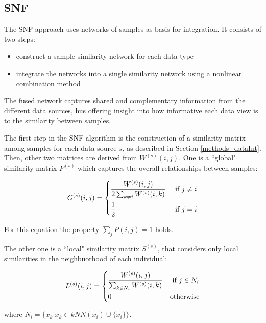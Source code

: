 \subsection{SNF} \label{dataInt_SNF}
The SNF\cite{wang2014similarity} approach uses networks of samples as basis for integration. It consists of two steps:
\begin{itemize}
    \item construct a sample-similarity network for each data type
    \item integrate the networks into a single similarity network using a nonlinear combination method
\end{itemize}
The fused network captures shared and complementary information from the different data sources, hus offering insight into how informative each data view is to the similarity between samples.

The first step in the SNF algorithm is the construction of a similarity matrix among samples for each data source $s$, as described in Section \ref{methods_dataInt}. Then, other two matrices are derived from $W^{(s)}(i,j)$. One is a ``global" similarity matrix $P^{(s)}$ which captures the overall relationships between samples:

\begin{equation}\label{eq:global_kernel}
    G^{(s)}(i,j) = 
    \begin{dcases}
        \frac{W^{(s)}(i,j)}{2 \sum_{k \neq i} W^{(s)}(i,k)} & \text{ if $j \neq i$}\\
        \frac{1}{2} & \text{ if $j = i$}\\
    \end{dcases}       
\end{equation}


For this equation the property $\sum_{j} P(i,j)=1$ holds.

The other one is a ``local" similarity matrix $S^{(s)}$, that considers only local similarities in the neighbuorhood of each individual:

\begin{equation}
\label{eq:local_kernel}
    L^{(s)}(i,j) = 
    \begin{dcases}
      \frac{W^{(s)}(i,j)}{\sum_{k \in N_i} W^{(s)}(i,k)} & \text{ if $j \in N_i$}\\
      0 & \text{otherwise}\\
    \end{dcases}       
\end{equation}

where $N_i = \{ x_k | x_k \in kNN(x_i) \cup \{ x_i \}\}$. \newline


